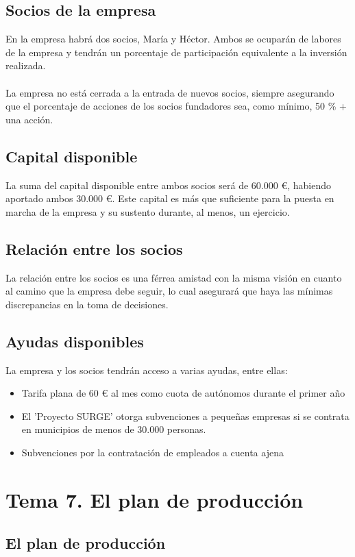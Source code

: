 \documentclass[openany,overnay,a4paper, twoside, 12pt]{book}
\begin{document}
\section{Socios de la empresa}
En la empresa habrá dos socios, María y Héctor. Ambos se ocuparán de labores de la empresa y tendrán un porcentaje de participación equivalente a la inversión realizada. \\\\La empresa no está cerrada a la entrada de nuevos socios, siempre asegurando que el porcentaje de acciones de los socios fundadores sea, como mínimo, 50 \% + una acción.

\section {Capital disponible}
La suma del capital disponible entre ambos socios será de 60.000 €, habiendo aportado ambos 30.000 €. Este capital es más que suficiente para la puesta en marcha de la empresa y su sustento durante, al menos, un ejercicio. 
\section{Relación entre los socios}
La relación entre los socios es una férrea amistad con la misma visión en cuanto al camino que la empresa debe seguir, lo cual asegurará que haya las mínimas discrepancias en la toma de decisiones. 
\section{Ayudas disponibles}
La empresa y los socios tendrán acceso a varias ayudas, entre ellas: 
\begin{itemize}
    \item Tarifa plana de 60 € al mes como cuota de autónomos durante el primer año
    \item El 'Proyecto SURGE' otorga subvenciones a pequeñas empresas si se contrata en municipios de menos de 30.000 personas.
    \item Subvenciones por la contratación de empleados a cuenta ajena
\end{itemize}
\setcounter{chapter}{7} %
\chapter*{Tema 7. El plan de producción}
\setcounter{section}{0}
\section{El plan de producción}
\end{document}
